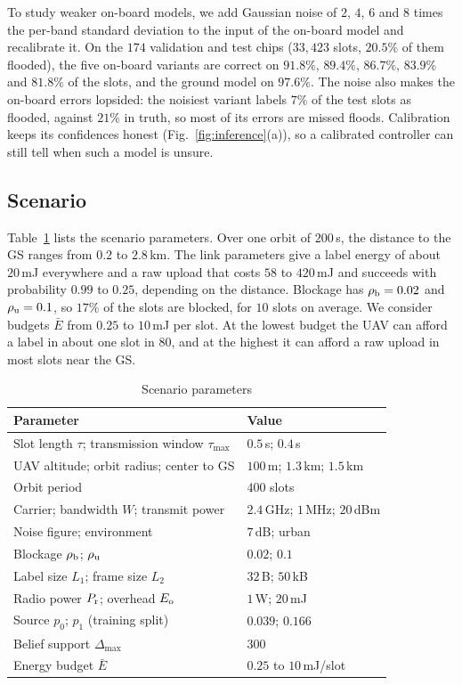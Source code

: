 To study weaker on-board models, we add Gaussian noise of $2$, $4$, $6$ and $8$ times the per-band standard deviation to the input of the on-board model and recalibrate it. On the $174$ validation and test chips ($33{,}423$ slots, $20.5\%$ of them flooded), the five on-board variants are correct on $91.8\%$, $89.4\%$, $86.7\%$, $83.9\%$ and $81.8\%$ of the slots, and the ground model on $97.6\%$. The noise also makes the on-board errors lopsided: the noisiest variant labels $7\%$ of the test slots as flooded, against $21\%$ in truth, so most of its errors are missed floods. Calibration keeps its confidences honest (Fig.~\ref{fig:inference}(a)), so a calibrated controller can still tell when such a model is unsure.

\subsection{Scenario}
Table~\ref{tab:params} lists the scenario parameters. Over one orbit of $200$\,s, the distance to the GS ranges from $0.2$ to $2.8$\,km. The link parameters give a label energy of about $20$\,mJ everywhere and a raw upload that costs $58$ to $420$\,mJ and succeeds with probability $0.99$ to $0.25$, depending on the distance. Blockage has $\rho_{\rm b}=0.02$ and $\rho_{\rm u}=0.1$, so $17\%$ of the slots are blocked, for $10$ slots on average. We consider budgets $\bar E$ from $0.25$ to $10$\,mJ per slot. At the lowest budget the UAV can afford a label in about one slot in $80$, and at the highest it can afford a raw upload in most slots near the GS.

\begin{table}[t]
\caption{Scenario parameters}\label{tab:params}
\centering\footnotesize
\begin{tabular}{@{}ll@{}}
\toprule
Parameter & Value\\
\midrule
Slot length $\tau$; transmission window $\tau_{\max}$ & $0.5$\,s; $0.4$\,s\\
UAV altitude; orbit radius; center to GS & $100$\,m; $1.3$\,km; $1.5$\,km\\
Orbit period & $400$ slots\\
Carrier; bandwidth $W$; transmit power & $2.4$\,GHz; $1$\,MHz; $20$\,dBm\\
Noise figure; environment & $7$\,dB; urban~\cite{alhourani2014lap}\\
Blockage $\rho_{\rm b}$; $\rho_{\rm u}$ & $0.02$; $0.1$\\
Label size $L_1$; frame size $L_2$ & $32$\,B; $50$\,kB\\
Radio power $P_{\rm r}$; overhead $E_{\rm o}$ & $1$\,W; $20$\,mJ\\
Source $p_0$; $p_1$ (training split) & $0.039$; $0.166$\\
Belief support $\Delta_{\max}$ & $300$\\
Energy budget $\bar E$ & $0.25$ to $10$\,mJ/slot\\
\bottomrule
\end{tabular}
\end{table}

